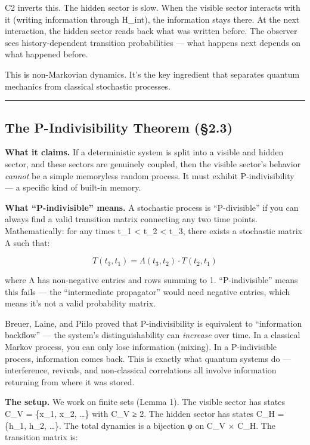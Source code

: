 \documentclass[
]{article}
\begin{document}
C2 inverts this. The hidden sector is slow. When the visible sector
interacts with it (writing information through H\_int), the information
stays there. At the next interaction, the hidden sector reads back what
was written before. The observer sees history-dependent transition
probabilities --- what happens next depends on what happened before.

This is non-Markovian dynamics. It's the key ingredient that separates
quantum mechanics from classical stochastic processes.

\begin{center}\rule{0.5\linewidth}{0.5pt}\end{center}

\hypertarget{the-p-indivisibility-theorem-2.3}{%
\subsection{The P-Indivisibility Theorem
(§2.3)}\label{the-p-indivisibility-theorem-2.3}}

\textbf{What it claims.} If a deterministic system is split into a
visible and hidden sector, and these sectors are genuinely coupled, then
the visible sector's behavior \emph{cannot} be a simple memoryless
random process. It must exhibit P-indivisibility --- a specific kind of
built-in memory.

\textbf{What ``P-indivisible'' means.} A stochastic process is
``P-divisible'' if you can always find a valid transition matrix
connecting any two time points. Mathematically: for any times t\_1
\textless{} t\_2 \textless{} t\_3, there exists a stochastic matrix Λ
such that:

\[T(t_3, t_1) = \Lambda(t_3, t_2) \cdot T(t_2, t_1)\]

where Λ has non-negative entries and rows summing to 1.
``P-indivisible'' means this fails --- the ``intermediate propagator''
would need negative entries, which means it's not a valid probability
matrix.

Breuer, Laine, and Piilo proved that P-indivisibility is equivalent to
``information backflow'' --- the system's distinguishability can
\emph{increase} over time. In a classical Markov process, you can only
lose information (mixing). In a P-indivisible process, information comes
back. This is exactly what quantum systems do --- interference,
revivals, and non-classical correlations all involve information
returning from where it was stored.

\textbf{The setup.} We work on finite sets (Lemma 1). The visible sector
has states C\_V = \{x\_1, x\_2, \ldots\} with \textbar C\_V\textbar{} ≥
2. The hidden sector has states C\_H = \{h\_1, h\_2, \ldots\}. The total
dynamics is a bijection φ on C\_V × C\_H. The transition matrix is:
\end{document}
